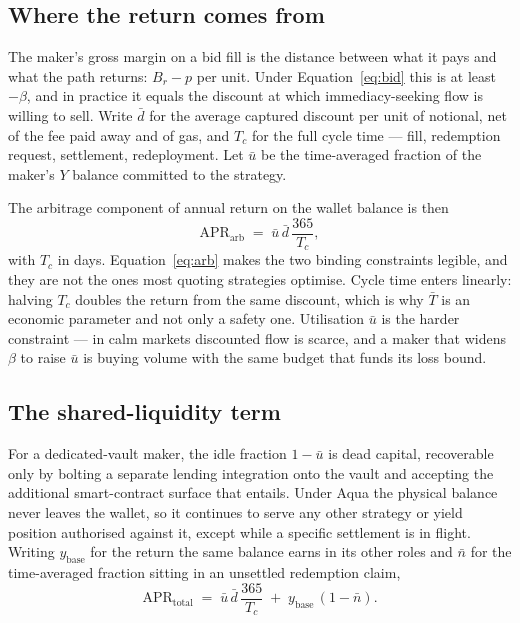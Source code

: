 \documentclass[10pt,twocolumn]{article}
\theoremstyle{definition}
\newcommand{\Br}{B_{r}}
\begin{document}
\subsection{Where the return comes from}

The maker's gross margin on a bid fill is the distance between what it pays and what the path returns:
$\Br - p$ per unit. Under Equation~\eqref{eq:bid} this is at least $-\beta$, and in practice it equals the
discount at which immediacy-seeking flow is willing to sell. Write $\bar{d}$ for the average captured discount per
unit of notional, net of the fee paid away and of gas, and $T_c$ for the full cycle time --- fill, redemption
request, settlement, redeployment. Let $\bar{u}$ be the time-averaged fraction of the maker's $Y$ balance
committed to the strategy.

The arbitrage component of annual return on the wallet balance is then
\begin{equation}
  \mathrm{APR}_{\mathrm{arb}} \;=\; \bar{u}\,\bar{d}\,\frac{365}{T_c},
  \label{eq:arb}
\end{equation}
with $T_c$ in days. Equation~\eqref{eq:arb} makes the two binding constraints legible, and they are not the ones
most quoting strategies optimise. Cycle time enters linearly: halving $T_c$ doubles the return from the same
discount, which is why $\bar T$ is an economic parameter and not only a safety one. Utilisation
$\bar u$ is the harder constraint --- in calm markets discounted flow is scarce, and a maker that widens $\beta$
to raise $\bar u$ is buying volume with the same budget that funds its loss bound.

\subsection{The shared-liquidity term}

For a dedicated-vault maker, the idle fraction $1 - \bar{u}$ is dead capital, recoverable only by bolting a
separate lending integration onto the vault and accepting the additional smart-contract surface that entails.
Under Aqua the physical balance never leaves the wallet, so it continues to serve any other strategy or yield
position authorised against it, except while a specific settlement is in flight. Writing $y_{\mathrm{base}}$ for
the return the same balance earns in its other roles and $\bar{n}$ for the time-averaged fraction sitting in an
unsettled redemption claim,
\begin{equation}
  \mathrm{APR}_{\mathrm{total}} \;=\; \bar{u}\,\bar{d}\,\frac{365}{T_c}
        \;+\; y_{\mathrm{base}}\,(1 - \bar{n}).
  \label{eq:total}
\end{equation}
\end{document}
